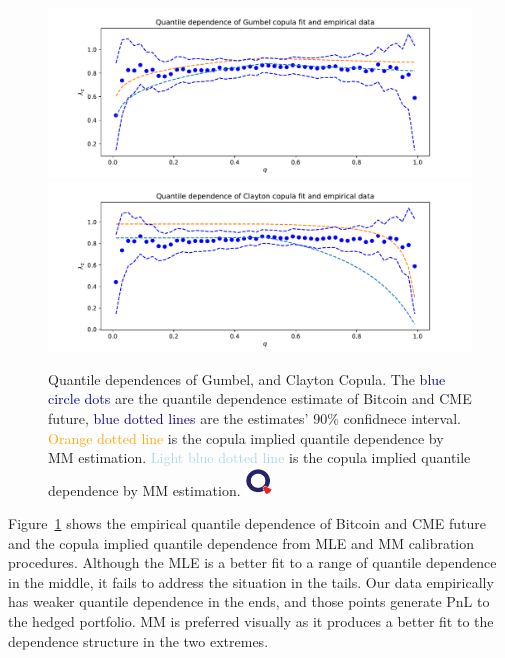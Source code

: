 \begin{figure}[h]
\includegraphics[width=\textwidth]{_pics/Gumbel Copula quantile dependence.pdf}
\includegraphics[width=\textwidth]{_pics/Clayton Copula quantile dependence.pdf}
  \caption{Quantile dependences of Gumbel, and Clayton Copula. The \textcolor{darkblue}{blue circle dots} are
  the quantile dependence estimate of Bitcoin and CME future, \textcolor{darkblue}{blue dotted lines} are the estimates' 90\% confidnece interval.
  \textcolor{orange}{Orange dotted line} is the copula implied quantile dependence by MM estimation.
  \textcolor{lightblue}{Light blue dotted line} is the copula implied quantile dependence by MM estimation.
  \href{http://www.quantlet.com/}{\includegraphics[width=20pt]{_pics/qletlogo_tr.png}} }
\label{fig:quantile dependence1}
\end{figure}

Figure~\ref{fig:quantile dependence1} shows the empirical quantile dependence of Bitcoin and CME future and the copula implied
quantile dependence from MLE and MM calibration procedures.
Although the MLE is a better fit to a range of quantile dependence in the middle, it fails to address the situation in the tails.
Our data empirically has weaker quantile dependence in the ends, and those points generate PnL to the hedged portfolio.
MM is preferred visually as it produces a better fit to the dependence structure in the two extremes.


